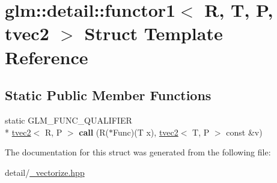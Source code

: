 \hypertarget{structglm_1_1detail_1_1functor1_3_01R_00_01T_00_01P_00_01tvec2_01_4}{\section{glm\-:\-:detail\-:\-:functor1$<$ R, T, P, tvec2 $>$ Struct Template Reference}
\label{structglm_1_1detail_1_1functor1_3_01R_00_01T_00_01P_00_01tvec2_01_4}
}
\subsection*{Static Public Member Functions}
\begin{DoxyCompactItemize}
\item 
\hypertarget{structglm_1_1detail_1_1functor1_3_01R_00_01T_00_01P_00_01tvec2_01_4_aaabd54c114db7c12681014fcbcf763bf}{static G\-L\-M\-\_\-\-F\-U\-N\-C\-\_\-\-Q\-U\-A\-L\-I\-F\-I\-E\-R \\*
\hyperlink{structglm_1_1tvec2}{tvec2}$<$ R, P $>$ {\bfseries call} (R($\ast$Func)(T x), \hyperlink{structglm_1_1tvec2}{tvec2}$<$ T, P $>$ const \&v)}\label{structglm_1_1detail_1_1functor1_3_01R_00_01T_00_01P_00_01tvec2_01_4_aaabd54c114db7c12681014fcbcf763bf}

\end{DoxyCompactItemize}


The documentation for this struct was generated from the following file\-:\begin{DoxyCompactItemize}
\item 
detail/\hyperlink{__vectorize_8hpp}{\-\_\-vectorize.\-hpp}\end{DoxyCompactItemize}
